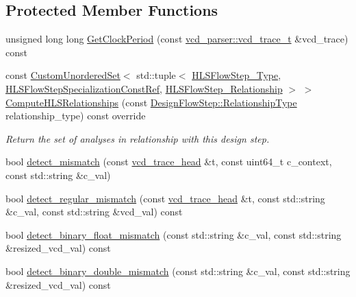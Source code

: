 \subsection*{Protected Member Functions}
\begin{DoxyCompactItemize}
\item 
unsigned long long \hyperlink{classvcd__utility_a8860891d7d9c6188515feb8ab0bddcf0}{Get\+Clock\+Period} (const \hyperlink{classvcd__parser_a84b85cb9df5165fca362a9da87c5a02f}{vcd\+\_\+parser\+::vcd\+\_\+trace\+\_\+t} \&vcd\+\_\+trace) const
\item 
const \hyperlink{classCustomUnorderedSet}{Custom\+Unordered\+Set}$<$ std\+::tuple$<$ \hyperlink{hls__step_8hpp_ada16bc22905016180e26fc7e39537f8d}{H\+L\+S\+Flow\+Step\+\_\+\+Type}, \hyperlink{hls__step_8hpp_a5fdd2edf290c196531d21d68e13f0e74}{H\+L\+S\+Flow\+Step\+Specialization\+Const\+Ref}, \hyperlink{hls__step_8hpp_a3ad360b9b11e6bf0683d5562a0ceb169}{H\+L\+S\+Flow\+Step\+\_\+\+Relationship} $>$ $>$ \hyperlink{classvcd__utility_a7c4de52630a3e3fa46286ffae1b94060}{Compute\+H\+L\+S\+Relationships} (const \hyperlink{classDesignFlowStep_a723a3baf19ff2ceb77bc13e099d0b1b7}{Design\+Flow\+Step\+::\+Relationship\+Type} relationship\+\_\+type) const override
\begin{DoxyCompactList}\small\item\em Return the set of analyses in relationship with this design step. \end{DoxyCompactList}\item 
bool \hyperlink{classvcd__utility_a29d328311cf59d9e96c777dbd4c7734e}{detect\+\_\+mismatch} (const \hyperlink{structvcd__trace__head}{vcd\+\_\+trace\+\_\+head} \&t, const uint64\+\_\+t c\+\_\+context, const std\+::string \&c\+\_\+val)
\item 
bool \hyperlink{classvcd__utility_ad2ab80e69aace43ba9a0d7881880cd1b}{detect\+\_\+regular\+\_\+mismatch} (const \hyperlink{structvcd__trace__head}{vcd\+\_\+trace\+\_\+head} \&t, const std\+::string \&c\+\_\+val, const std\+::string \&vcd\+\_\+val) const
\item 
bool \hyperlink{classvcd__utility_af72ee3efc398a2cded1b268c1eaf92cd}{detect\+\_\+binary\+\_\+float\+\_\+mismatch} (const std\+::string \&c\+\_\+val, const std\+::string \&resized\+\_\+vcd\+\_\+val) const
\item 
bool \hyperlink{classvcd__utility_adb80e05f3d7c891116d8be21c21c84db}{detect\+\_\+binary\+\_\+double\+\_\+mismatch} (const std\+::string \&c\+\_\+val, const std\+::string \&resized\+\_\+vcd\+\_\+val) const
\item 

\end{DoxyCompactItemize}
